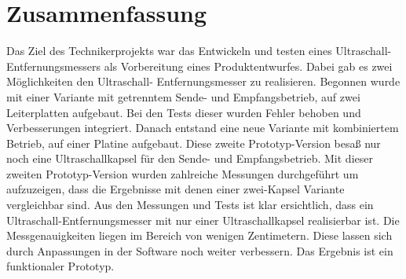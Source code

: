 \section{Zusammenfassung}
Das Ziel des Technikerprojekts war das Entwickeln und testen eines Ultraschall-Entfernungsmessers als Vorbereitung eines Produktentwurfes. Dabei gab es zwei Möglichkeiten den Ultraschall- Entfernungsmesser zu realisieren. Begonnen wurde mit einer Variante mit getrenntem Sende- und Empfangsbetrieb, auf zwei Leiterplatten aufgebaut. Bei den Tests dieser wurden Fehler behoben und Verbesserungen integriert. Danach entstand eine neue Variante mit kombiniertem Betrieb, auf einer Platine aufgebaut. Diese zweite Prototyp-Version besaß nur noch eine Ultraschallkapsel für den Sende- und Empfangsbetrieb. Mit dieser zweiten Prototyp-Version wurden zahlreiche Messungen durchgeführt um aufzuzeigen, dass die Ergebnisse mit denen einer zwei-Kapsel Variante vergleichbar sind.
Aus den Messungen und Tests ist klar ersichtlich, dass ein Ultraschall-Entfernungsmesser mit nur einer Ultraschallkapsel realisierbar ist. Die Messgenauigkeiten liegen im Bereich von wenigen Zentimetern. Diese lassen sich durch Anpassungen in der Software noch weiter verbessern. Das Ergebnis ist ein funktionaler Prototyp.


